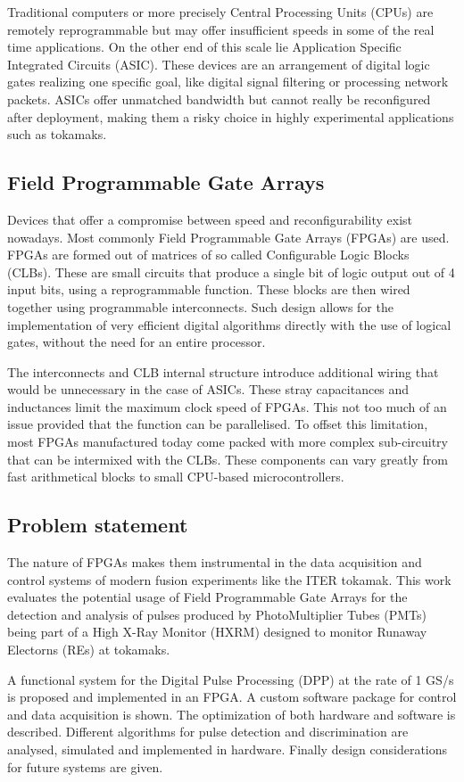 	Traditional computers or more precisely Central Processing Units (CPUs) 
	are remotely reprogrammable but may offer insufficient speeds in 
	some of the real time applications. On the other end of this scale lie 
	Application Specific Integrated Circuits (ASIC). These devices are an 
	arrangement of digital logic gates realizing one specific goal, like 
	digital signal filtering or processing network packets.
	ASICs offer unmatched bandwidth but cannot really be reconfigured
	after deployment, making them a risky choice in highly experimental
	applications such as tokamaks.

\subsection{Field Programmable Gate Arrays}
Devices that offer a compromise between speed and reconfigurability
exist nowadays. Most commonly Field Programmable Gate Arrays (FPGAs) are used.
FPGAs are formed out of matrices of so called Configurable Logic Blocks (CLBs).
These are small circuits that produce a single bit of logic output
out of 4 input bits, using a reprogrammable function. These blocks 
are then wired together using programmable interconnects. Such design 
allows for the implementation of very efficient digital algorithms
directly with the use of logical gates, without the need for an
entire processor. \cite{xilinx_what_is_fpga}


The interconnects and CLB internal structure introduce additional wiring
that would be unnecessary in the case of ASICs. These stray capacitances 
and inductances limit the maximum clock speed of FPGAs. This not too much
of an issue provided that the function can be parallelised. To offset 
this limitation, most FPGAs manufactured today come packed with 
more complex sub-circuitry that can be intermixed with the CLBs.
These components can vary greatly from fast arithmetical blocks
to small CPU-based microcontrollers.

\subsection{Problem statement}

The nature of FPGAs makes them instrumental in the data acquisition 
and control systems of modern fusion experiments like the ITER tokamak.
This work evaluates the potential usage of Field Programmable Gate Arrays
for the detection and analysis of pulses produced by PhotoMultiplier Tubes (PMTs)
being part of a High X-Ray Monitor (HXRM) designed to monitor Runaway Electorns
(REs) at tokamaks.


A functional system for the Digital Pulse Processing (DPP) at the rate of 
1 GS/s is proposed and implemented in an FPGA. A custom
software package for control and data acquisition is shown.
The optimization of both hardware and software is described.
Different algorithms for pulse detection and discrimination
are analysed, simulated and implemented in hardware. Finally design
considerations for future systems are given.

